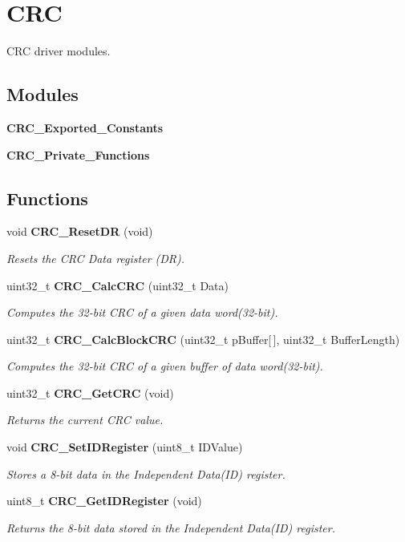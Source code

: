 \section{C\+RC}
\label{group__CRC}


C\+RC driver modules.  


\subsection*{Modules}
\begin{DoxyCompactItemize}
\item 
\textbf{ C\+R\+C\+\_\+\+Exported\+\_\+\+Constants}
\item 
\textbf{ C\+R\+C\+\_\+\+Private\+\_\+\+Functions}
\end{DoxyCompactItemize}
\subsection*{Functions}
\begin{DoxyCompactItemize}
\item 
void \textbf{ C\+R\+C\+\_\+\+Reset\+DR} (void)
\begin{DoxyCompactList}\small\item\em Resets the C\+RC Data register (DR). \end{DoxyCompactList}\item 
uint32\+\_\+t \textbf{ C\+R\+C\+\_\+\+Calc\+C\+RC} (uint32\+\_\+t Data)
\begin{DoxyCompactList}\small\item\em Computes the 32-\/bit C\+RC of a given data word(32-\/bit). \end{DoxyCompactList}\item 
uint32\+\_\+t \textbf{ C\+R\+C\+\_\+\+Calc\+Block\+C\+RC} (uint32\+\_\+t p\+Buffer[$\,$], uint32\+\_\+t Buffer\+Length)
\begin{DoxyCompactList}\small\item\em Computes the 32-\/bit C\+RC of a given buffer of data word(32-\/bit). \end{DoxyCompactList}\item 
uint32\+\_\+t \textbf{ C\+R\+C\+\_\+\+Get\+C\+RC} (void)
\begin{DoxyCompactList}\small\item\em Returns the current C\+RC value. \end{DoxyCompactList}\item 
void \textbf{ C\+R\+C\+\_\+\+Set\+I\+D\+Register} (uint8\+\_\+t I\+D\+Value)
\begin{DoxyCompactList}\small\item\em Stores a 8-\/bit data in the Independent Data(\+I\+D) register. \end{DoxyCompactList}\item 
uint8\+\_\+t \textbf{ C\+R\+C\+\_\+\+Get\+I\+D\+Register} (void)
\begin{DoxyCompactList}\small\item\em Returns the 8-\/bit data stored in the Independent Data(\+I\+D) register. \end{DoxyCompactList}\end{DoxyCompactItemize}


